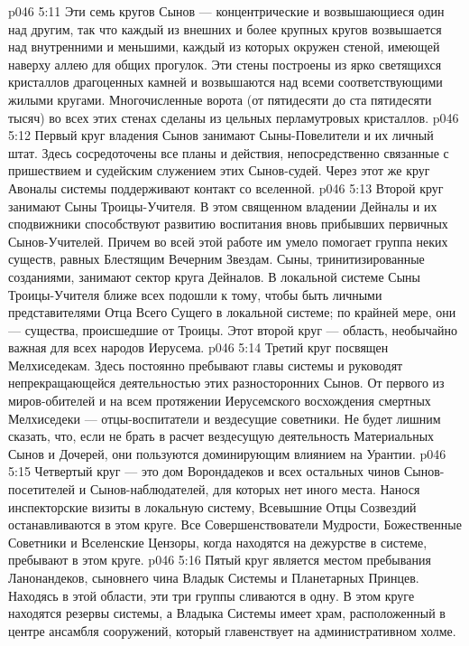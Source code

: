 \vs p046 5:11 Эти семь кругов Сынов --- концентрические и возвышающиеся один над другим, так что каждый из внешних и более крупных кругов возвышается над внутренними и меньшими, каждый из которых окружен стеной, имеющей наверху аллею для общих прогулок. Эти стены построены из ярко светящихся кристаллов драгоценных камней и возвышаются над всеми соответствующими жилыми кругами. Многочисленные ворота (от пятидесяти до ста пятидесяти тысяч) во всех этих стенах сделаны из цельных перламутровых кристаллов.
\vs p046 5:12 Первый круг владения Сынов занимают Сыны\hyp{}Повелители и их личный штат. Здесь сосредоточены все планы и действия, непосредственно связанные с пришествием и судейским служением этих Сынов\hyp{}судей. Через этот же круг Авоналы системы поддерживают контакт со вселенной.
\vs p046 5:13 Второй круг занимают Сыны Троицы\hyp{}Учителя. В этом священном владении Дейналы и их сподвижники способствуют развитию воспитания вновь прибывших первичных Сынов\hyp{}Учителей. Причем во всей этой работе им умело помогает группа неких существ, равных Блестящим Вечерним Звездам. Сыны, тринитизированные созданиями, занимают сектор круга Дейналов. В локальной системе Сыны Троицы\hyp{}Учителя ближе всех подошли к тому, чтобы быть личными представителями Отца Всего Сущего в локальной системе; по крайней мере, они --- существа, происшедшие от Троицы. Этот второй круг --- область, необычайно важная для всех народов Иерусема.
\vs p046 5:14 Третий круг посвящен Мелхиседекам. Здесь постоянно пребывают главы системы и руководят непрекращающейся деятельностью этих разносторонних Сынов. От первого из миров\hyp{}обителей и на всем протяжении Иерусемского восхождения смертных Мелхиседеки --- отцы\hyp{}воспитатели и вездесущие советники. Не будет лишним сказать, что, если не брать в расчет вездесущую деятельность Материальных Сынов и Дочерей, они пользуются доминирующим влиянием на Урантии.
\vs p046 5:15 Четвертый круг --- это дом Ворондадеков и всех остальных чинов Сынов\hyp{}посетителей и Сынов\hyp{}наблюдателей, для которых нет иного места. Нанося инспекторские визиты в локальную систему, Всевышние Отцы Созвездий останавливаются в этом круге. Все Совершенствователи Мудрости, Божественные Советники и Вселенские Цензоры, когда находятся на дежурстве в системе, пребывают в этом круге.
\vs p046 5:16 Пятый круг является местом пребывания Ланонандеков, сыновнего чина Владык Системы и Планетарных Принцев. Находясь в этой области, эти три группы сливаются в одну. В этом круге находятся резервы системы, а Владыка Системы имеет храм, расположенный в центре ансамбля сооружений, который главенствует на административном холме.
